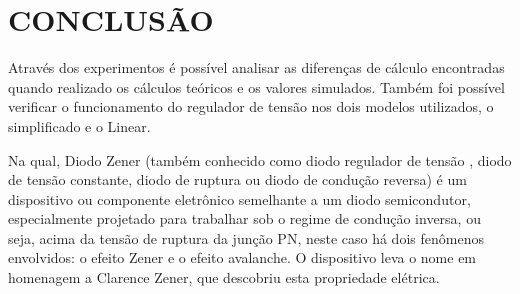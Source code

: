\chapter{CONCLUSÃO}

Através dos experimentos é possível analisar as diferenças de cálculo encontradas quando realizado os cálculos teóricos e os valores simulados. Também foi possível verificar o funcionamento do regulador de tensão nos dois modelos utilizados, o simplificado e o Linear.

Na qual, Diodo Zener (também conhecido como diodo regulador de tensão , diodo de tensão constante, diodo de ruptura ou diodo de condução reversa) é um dispositivo ou componente eletrônico semelhante a um diodo semicondutor, especialmente projetado para trabalhar sob o regime de condução inversa, ou seja, acima da tensão de ruptura da junção PN, neste caso há dois fenômenos envolvidos: o efeito Zener e o efeito avalanche. O dispositivo leva o nome em homenagem a Clarence Zener, que descobriu esta propriedade elétrica.